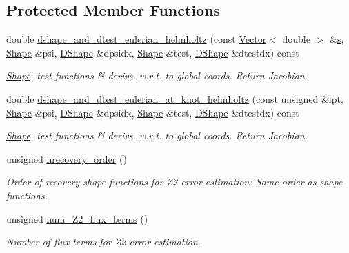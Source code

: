 \subsection*{Protected Member Functions}
\begin{DoxyCompactItemize}
\item 
double \hyperlink{classoomph_1_1TPMLHelmholtzElement_a6a4c48e090653977917c463c628b0585}{dshape\+\_\+and\+\_\+dtest\+\_\+eulerian\+\_\+helmholtz} (const \hyperlink{classoomph_1_1Vector}{Vector}$<$ double $>$ \&\hyperlink{cfortran_8h_ab7123126e4885ef647dd9c6e3807a21c}{s}, \hyperlink{classoomph_1_1Shape}{Shape} \&psi, \hyperlink{classoomph_1_1DShape}{D\+Shape} \&dpsidx, \hyperlink{classoomph_1_1Shape}{Shape} \&test, \hyperlink{classoomph_1_1DShape}{D\+Shape} \&dtestdx) const
\begin{DoxyCompactList}\small\item\em \hyperlink{classoomph_1_1Shape}{Shape}, test functions \& derivs. w.\+r.\+t. to global coords. Return Jacobian. \end{DoxyCompactList}\item 
double \hyperlink{classoomph_1_1TPMLHelmholtzElement_aef6adcd4002aa3fac6d5d45ac5ac779b}{dshape\+\_\+and\+\_\+dtest\+\_\+eulerian\+\_\+at\+\_\+knot\+\_\+helmholtz} (const unsigned \&ipt, \hyperlink{classoomph_1_1Shape}{Shape} \&psi, \hyperlink{classoomph_1_1DShape}{D\+Shape} \&dpsidx, \hyperlink{classoomph_1_1Shape}{Shape} \&test, \hyperlink{classoomph_1_1DShape}{D\+Shape} \&dtestdx) const
\begin{DoxyCompactList}\small\item\em \hyperlink{classoomph_1_1Shape}{Shape}, test functions \& derivs. w.\+r.\+t. to global coords. Return Jacobian. \end{DoxyCompactList}\item 
unsigned \hyperlink{classoomph_1_1TPMLHelmholtzElement_a814d0a7d186f7986d9d99939ca26fc2d}{nrecovery\+\_\+order} ()
\begin{DoxyCompactList}\small\item\em Order of recovery shape functions for Z2 error estimation\+: Same order as shape functions. \end{DoxyCompactList}\item 
unsigned \hyperlink{classoomph_1_1TPMLHelmholtzElement_acbab5e3abc283ce69dda34f9a039f60f}{num\+\_\+\+Z2\+\_\+flux\+\_\+terms} ()
\begin{DoxyCompactList}\small\item\em Number of \textquotesingle{}flux\textquotesingle{} terms for Z2 error estimation. \end{DoxyCompactList}\item 

\end{DoxyCompactItemize}
